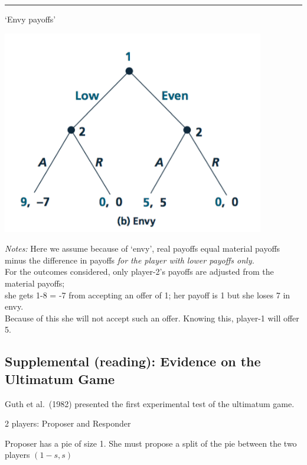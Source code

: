 \documentclass[]{article}
\begin{document}
\begin{center}\rule{0.5\linewidth}{\linethickness}\end{center}

`Envy payoffs'

\includegraphics[height=3.5in]{picsfigs/ultimatumenvy.png}

\emph{Notes:}
Here we assume because of `envy', real payoffs equal material payoffs minus the difference in payoffs \emph{for the player with lower payoffs only.}\\
For the outcomes considered, only player-2's payoffs are adjusted from the material payoffs;\\
she gets 1-8 = -7 from accepting an offer of 1; her payoff is 1 but she loses 7 in envy.\\
Because of this she will not accept such an offer. Knowing this, player-1 will offer 5.

\hypertarget{supplemental-reading-evidence-on-the-ultimatum-game}{%
\subsection{Supplemental (reading): Evidence on the Ultimatum Game}\label{supplemental-reading-evidence-on-the-ultimatum-game}}

Guth et al.~(1982) presented the first experimental test of the ultimatum game.

\bigskip

2 players: Proposer and Responder

\bigskip

Proposer has a pie of size 1. She must propose a split of the pie between the two players \((1-s, s)\)
\end{document}
